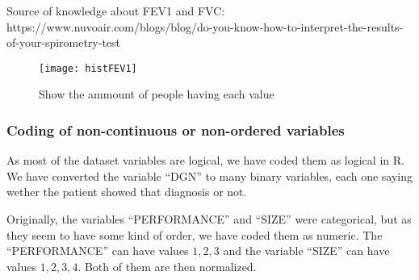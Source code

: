 Source of knowledge about FEV1 and FVC:
https://www.nuvoair.com/blogs/blog/do-you-know-how-to-interpret-the-results-of-your-spirometry-test






\begin{figure}[bh]
\centering
\texttt{[image: histFEV1]}
\label{fig:histFEV1}
\caption{Show the ammount of people having each value}
\end{figure}
\subsubsection{Coding of non-continuous or non-ordered variables}

%
%
%

As most of the dataset variables are logical, we have coded them as logical in R. We have converted the variable ``DGN'' to many binary variables, each one saying wether the patient showed that diagnosis or not.

Originally, the variables ``PERFORMANCE'' and ``SIZE'' were categorical, but as they seem to have some kind of order, we have coded them as numeric. The ``PERFORMANCE'' can have values \(1,2,3\) and the variable ``SIZE'' can have values \(1,2,3,4\). Both of them are then normalized.

